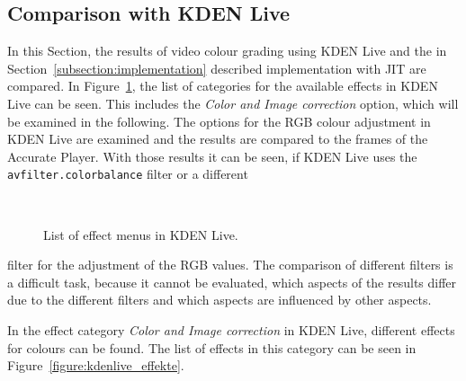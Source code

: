 \documentclass[../MasterThesis.tex]{subfiles}
\begin{document}


\subsection{Comparison with KDEN Live} \label{section:comparisonKDENLive}


\begin{minipage}{0.58\textwidth}
	
	In this Section, the results of video colour grading using KDEN Live and the in Section~\ref{subsection:implementation} described implementation with JIT are compared. In Figure~\ref{figure:kdenlive_effects}, the list of categories for the available effects in KDEN Live can be seen. This includes the \textit{Color and Image correction} option, which will be examined in the following. The options for the RGB colour adjustment in KDEN Live are examined and the results are compared to the frames of the Accurate Player. With those results it can be seen, if KDEN Live uses the \texttt{avfilter.colorbalance} filter or a different 
	
	
\end{minipage}\begin{minipage}{0.04\textwidth}
	\ 
\end{minipage}\begin{minipage}{0.38\textwidth}
	\begin{figure}[H]
		\begin{center}
			\caption[List of effect menus in KDEN Live.]{List of effect menus in KDEN Live.}
			\label{figure:kdenlive_effects}
		\end{center}
	\end{figure}
	\vfill
\end{minipage}

\vspace*{0.2em}

filter for the adjustment of the RGB values. 
The comparison of different filters is a difficult task, because it cannot be evaluated, which aspects of the results differ due to the different filters and which aspects are influenced by other aspects.


In the effect category \textit{Color and Image correction} in KDEN Live, different effects for colours can be found. The list of effects in this category can be seen in Figure~\ref{figure:kdenlive_effekte}. 
\end{document}
